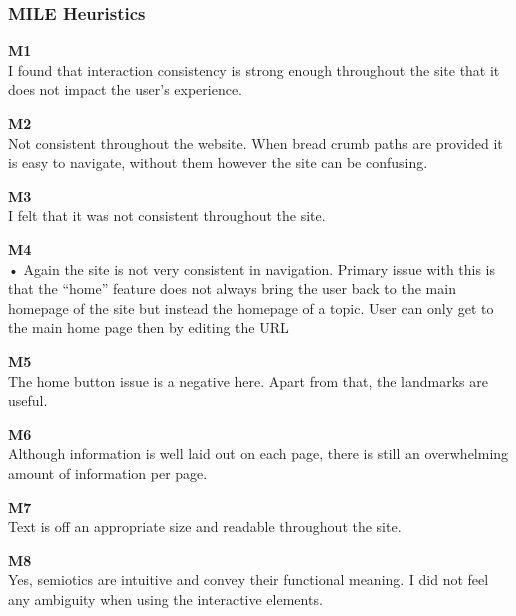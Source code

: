 \subsubsection{MILE Heuristics}
\begin{description}
    \item {\textbf{M1} \color{unicefGray}{Interaction consistency}}\\
    I found that interaction consistency is strong enough throughout the site that it does not impact the user’s experience. 
    \item {\textbf{M2} \color{unicefGray}{Group navigation}}\\
    Not consistent throughout the website. When bread crumb paths are provided it is easy to navigate, without them however the site can be confusing. 
    \item {\textbf{M3} \color{unicefGray}{Structural Navigation}}\\
    I felt that it was not consistent throughout the site. 
    \item {\textbf{M4} \color{unicefGray}{Semantic Navigation}}\\
    •	Again the site is not very consistent in navigation. Primary issue with this is that the “home” feature does not always bring the user back to the main homepage of the site but instead the homepage of a topic. User can only get to the main home page then by editing the URL
    \item {\textbf{M5} \color{unicefGray}{landmarks}}\\
    The home button issue is a negative here. Apart from that, the landmarks are useful.
    \item {\textbf{M6} \color{unicefGray}{Information overload}}\\
    Although information is well laid out on each page, there is still an overwhelming amount of information per page. 
    \item {\textbf{M7} \color{unicefGray}{Text layout}}\\
    Text is off an appropriate size and readable throughout the site.
    \item {\textbf{M8} \color{unicefGray}{Interaction placeholder semiotics}}\\
    Yes, semiotics are intuitive and convey their functional meaning. I did not feel any ambiguity when using the interactive elements.
    \begin{figure}[h]
        \centering

\end{figure}
\end{description}
